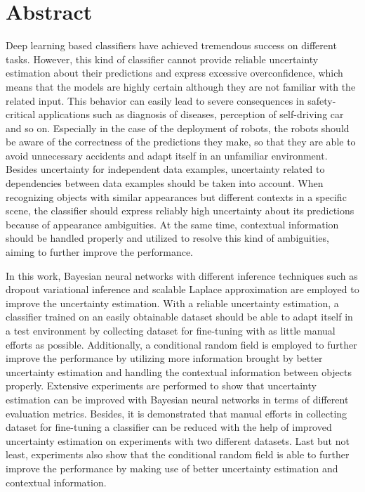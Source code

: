 
\thispagestyle{plain}

\section*{Abstract}
Deep learning based classifiers have achieved tremendous success on different tasks. However, this kind of classifier cannot provide reliable uncertainty estimation about their predictions and express excessive overconfidence, which means that the models are highly certain although they are not familiar with the related input. This behavior can easily lead to severe consequences in safety-critical applications such as diagnosis of diseases, perception of self-driving car and so on. Especially in the case of the deployment of robots, the robots should be aware of the correctness of the predictions they make, so that they are able to avoid unnecessary accidents and adapt itself in an unfamiliar environment. Besides uncertainty for independent data examples, uncertainty related to dependencies between data examples should be taken into account. When recognizing objects with similar appearances but different contexts in a specific scene, the classifier should express reliably high uncertainty about its predictions because of appearance ambiguities. At the same time, contextual information should be handled properly and utilized to resolve this kind of ambiguities, aiming to further improve the performance. 

In this work, Bayesian neural networks with different inference techniques such as dropout variational inference and scalable Laplace approximation are employed to improve the uncertainty estimation. With a reliable uncertainty estimation, a classifier trained on an easily obtainable dataset should be able to adapt itself in a test environment by collecting dataset for fine-tuning with as little manual efforts as possible. Additionally, a conditional random field is employed to further improve the performance by utilizing more information brought by better uncertainty estimation and handling the contextual information between objects properly. Extensive experiments are performed to show that uncertainty estimation can be improved with Bayesian neural networks in terms of different evaluation metrics. Besides, it is demonstrated that manual efforts in collecting dataset for fine-tuning a classifier can be reduced with the help of improved uncertainty estimation on experiments with two different datasets. Last but not least, experiments also show that the conditional random field is able to further improve the performance by making use of better uncertainty estimation and contextual information.

\switchlanguage{\lang} %
